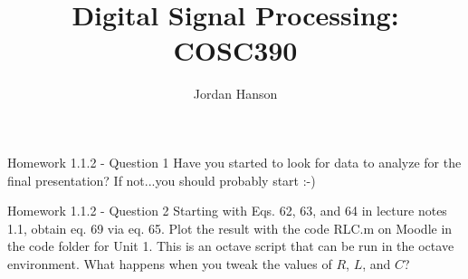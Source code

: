\documentclass{beamer}
\title{Digital Signal Processing: COSC390}
\author{Jordan Hanson}
\institute{Whittier College Department of Physics and Astronomy}
\begin{document}
\maketitle

\begin{frame}{Homework 1.1.2 - Question 1}
Have you started to look for data to analyze for the final presentation?  If not...you should probably start :-)
\end{frame}

\begin{frame}{Homework 1.1.2 - Question 2}
Starting with Eqs. 62, 63, and 64 in lecture notes 1.1, obtain eq. 69 via eq. 65.  Plot the result with the code RLC.m on Moodle in the code folder for Unit 1.  This is an octave script that can be run in the octave environment.  What happens when you tweak the values of $R$, $L$, and $C$?
\end{frame}
\end{document}
